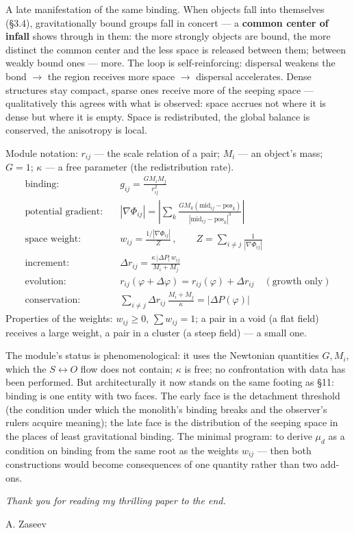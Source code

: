 \documentclass{article}
\begin{document}
A late manifestation of the same binding. When objects fall into themselves (\S3.4), gravitationally bound groups fall in concert --- a \textbf{common center of infall} shows through in them: the more strongly objects are bound, the more distinct the common center and the less space is released between them; between weakly bound ones --- more. The loop is self-reinforcing: dispersal weakens the bond $\to$ the region receives more space $\to$ dispersal accelerates. Dense structures stay compact, sparse ones receive more of the seeping space --- qualitatively this agrees with what is observed: space accrues not where it is dense but where it is empty. Space is redistributed, the global balance is conserved, the anisotropy is local.

Module notation: $r_{ij}$ --- the scale relation of a pair; $M_i$ --- an object's mass; $G = 1$; $\kappa$ --- a free parameter (the redistribution rate).
\begin{align}
\text{binding:} &\quad g_{ij} = \frac{G M_i M_j}{r_{ij}^2} \\
\text{potential gradient:} &\quad |\nabla\Phi_{ij}| = \left| \sum_k \frac{G M_k (\text{mid}_{ij} - \text{pos}_k)}{|\text{mid}_{ij} - \text{pos}_k|^3} \right| \\
\text{space weight:} &\quad w_{ij} = \frac{1/|\nabla\Phi_{ij}|}{Z}\,, \qquad Z = \sum_{i\neq j} \frac{1}{|\nabla\Phi_{ij}|} \\
\text{increment:} &\quad \Delta r_{ij} = \frac{\kappa\,|\Delta P|\,w_{ij}}{M_i + M_j} \\
\text{evolution:} &\quad r_{ij}(\varphi+\Delta\varphi) = r_{ij}(\varphi) + \Delta r_{ij} \quad (\text{growth only}) \\
\text{conservation:} &\quad \sum_{i\neq j} \Delta r_{ij}\,\frac{M_i + M_j}{\kappa} = |\Delta P(\varphi)|
\end{align}
Properties of the weights: $w_{ij} \ge 0$, $\sum w_{ij} = 1$; a pair in a void (a flat field) receives a large weight, a pair in a cluster (a steep field) --- a small one.

The module's status is phenomenological: it uses the Newtonian quantities $G, M_i$, which the $S \leftrightarrow O$ flow does not contain; $\kappa$ is free; no confrontation with data has been performed. But architecturally it now stands on the same footing as \S11: binding is one entity with two faces. The early face is the detachment threshold (the condition under which the monolith's binding breaks and the observer's rulers acquire meaning); the late face is the distribution of the seeping space in the places of least gravitational binding. The minimal program: to derive $\mu_d$ as a condition on binding from the same root as the weights $w_{ij}$ --- then both constructions would become consequences of one quantity rather than two add-ons.

\bigskip
\noindent\textit{Thank you for reading my thrilling paper to the end.}

\medskip
\noindent A. Zaseev
\end{document}
